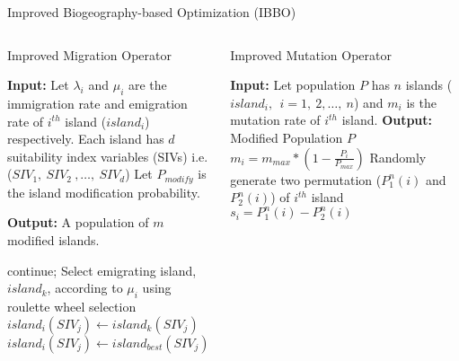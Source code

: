 \documentclass [9pt,times] {beamer}
\begin{document}
\begin{frame}[fragile]{Improved Biogeography-based Optimization (IBBO)}
\begin{columns}

\begin{column}{5.5cm}
\begin{block}{Improved Migration Operator}
\begin{algorithm}[H]
\scriptsize
\begin{algorithmic}[1]
\STATE \textbf{Input:} Let  $\lambda_i$ and $\mu_i$ are the immigration rate and emigration rate of $i^{th}$ island ($island_i$) respectively.
\STATE Each island has $d$ suitability index variables (SIVs) i.e.  ($SIV_1, \ SIV_2\ ,\dots, \ SIV_d$) 
\STATE Let $P_{modify}$ is the island modification probability.

	\STATE \textbf{Output: } A population of $m$ modified islands.

	\STATE	continue;
  \ENDIF
		\STATE Select emigrating island, $island_k$, according to $\mu_i$ using roulette wheel selection
		   \STATE  \textcolor[rgb]{0.00,0.00,1.00}{$island_i(SIV_j) \leftarrow island_k(SIV_j)$}
    \ELSE
		 \STATE \textcolor[rgb]{0.00,0.00,1.00}{$island_i(SIV_j) \leftarrow island_{best}(SIV_j)$}
     
    \ENDIF
\ENDFOR
\ENDFOR
\end{algorithmic}
\end{algorithm}
\end{block}
\end{column}
\hspace{3pt}
\begin{column}{5cm}
\begin{block}{Improved Mutation Operator}
\begin{algorithm}[H]
\scriptsize
\begin{algorithmic}[1]
\STATE \textbf{Input:}  Let population $P$ has $n$ islands ($island_i,\ \ i=1,\ 2,\dots, \ n$) and $m_i$ is the mutation rate of $i^{th}$ island. 
	\STATE \textbf{Output: } Modified Population $P$
\STATE $m_i=m_{max}*(1-\frac{P_i}{P_{max}} )$
     \STATE \textcolor[rgb]{0.00,0.00,1.00} {Randomly generate two permutation ($P^n_1(i)$ and $P^n_2(i)$) of $i^{th}$ island}
\STATE \textcolor[rgb]{0.00,0.00,1.00}{$s_i= P^n_1(i)- P^n_2(i)$}


\end{algorithmic}
\end{algorithm}
\end{block}
\end{column}
\end{columns}
\end{frame}
\end{document}
